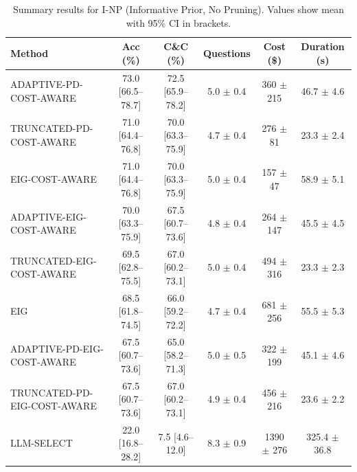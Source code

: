 \begin{table}[htbp]
\centering
\small
\caption{Summary results for I-NP (Informative Prior, No Pruning). Values show mean with 95\% CI in brackets.}
\label{tab:results-notprune_notuniform}
\begin{tabular}{@{}lccccc@{}}
\toprule
Method & Acc (\%) & C\&C (\%) & Questions & Cost (\$) & Duration (s) \\
\midrule
ADAPTIVE-PD-COST-AWARE & 73.0 [66.5--78.7] & 72.5 [65.9--78.2] & 5.0 $\pm$ 0.4 & 360 $\pm$ 215 & 46.7 $\pm$ 4.6 \\
TRUNCATED-PD-COST-AWARE & 71.0 [64.4--76.8] & 70.0 [63.3--75.9] & 4.7 $\pm$ 0.4 & 276 $\pm$ 81 & 23.3 $\pm$ 2.4 \\
EIG-COST-AWARE & 71.0 [64.4--76.8] & 70.0 [63.3--75.9] & 5.0 $\pm$ 0.4 & 157 $\pm$ 47 & 58.9 $\pm$ 5.1 \\
ADAPTIVE-EIG-COST-AWARE & 70.0 [63.3--75.9] & 67.5 [60.7--73.6] & 4.8 $\pm$ 0.4 & 264 $\pm$ 147 & 45.5 $\pm$ 4.5 \\
TRUNCATED-EIG-COST-AWARE & 69.5 [62.8--75.5] & 67.0 [60.2--73.1] & 5.0 $\pm$ 0.4 & 494 $\pm$ 316 & 23.3 $\pm$ 2.3 \\
EIG & 68.5 [61.8--74.5] & 66.0 [59.2--72.2] & 4.7 $\pm$ 0.4 & 681 $\pm$ 256 & 55.5 $\pm$ 5.3 \\
ADAPTIVE-PD-EIG-COST-AWARE & 67.5 [60.7--73.6] & 65.0 [58.2--71.3] & 5.0 $\pm$ 0.5 & 322 $\pm$ 199 & 45.1 $\pm$ 4.6 \\
TRUNCATED-PD-EIG-COST-AWARE & 67.5 [60.7--73.6] & 67.0 [60.2--73.1] & 4.9 $\pm$ 0.4 & 456 $\pm$ 216 & 23.6 $\pm$ 2.2 \\
LLM-SELECT & 22.0 [16.8--28.2] & 7.5 [4.6--12.0] & 8.3 $\pm$ 0.9 & 1390 $\pm$ 276 & 325.4 $\pm$ 36.8 \\
\bottomrule
\end{tabular}
\end{table}
